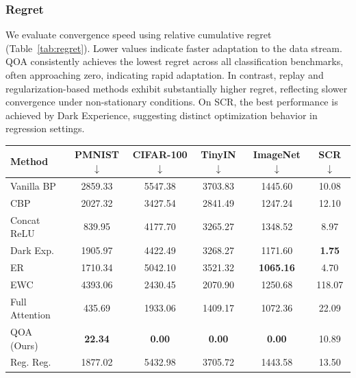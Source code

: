 \documentclass{article}
\begin{document}
\normalfont
\raggedright
\subsubsection{Regret}

We evaluate convergence speed using relative cumulative regret (Table~\ref{tab:regret}). Lower values indicate faster adaptation to the data stream. QOA consistently achieves the lowest regret across all classification benchmarks, often approaching zero, indicating rapid adaptation. In contrast, replay and regularization-based methods exhibit substantially higher regret, reflecting slower convergence under non-stationary conditions. On SCR, the best performance is achieved by Dark Experience, suggesting distinct optimization behavior in regression settings.

\vspace{2mm}
\noindent
\begin{minipage}{\columnwidth}
\centering
\footnotesize
\setlength{\tabcolsep}{2.5pt}

\begin{tabular}{lccccc}
\toprule
Method & PMNIST $\downarrow$ & CIFAR-100 $\downarrow$ & TinyIN $\downarrow$ & ImageNet $\downarrow$ & SCR $\downarrow$ \\
\midrule
Vanilla BP      & 2859.33 & 5547.38 & 3703.83 & 1445.60 & 10.08 \\
CBP             & 2027.32 & 3427.54 & 2841.49 & 1247.24 & 12.10 \\
Concat ReLU     & 839.95  & 4177.70 & 3265.27 & 1348.52 & 8.97 \\
Dark Exp.       & 1905.97 & 4422.49 & 3268.27 & 1171.60 & \textbf{1.75} \\
ER              & 1710.34 & 5042.10 & 3521.32 & \textbf{1065.16} & 4.70 \\
EWC             & 4393.06 & 2430.45 & 2070.90 & 1250.68 & 118.07 \\
Full Attention  & 435.69  & 1933.06 & 1409.17 & 1072.36 & 22.09 \\
QOA (Ours)      & \textbf{22.34} & \textbf{0.00} & \textbf{0.00} & \textbf{0.00} & 10.89 \\
Reg. Reg.       & 1877.02 & 5432.98 & 3705.72 & 1443.58 & 13.50 \\
\bottomrule
\end{tabular}

\label{tab:regret}

\end{minipage}
\end{document}
